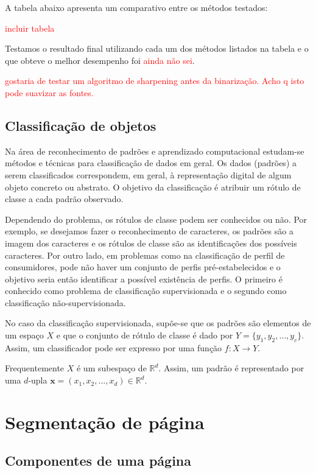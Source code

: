 \documentclass[a4paper,11pt]{article}
\newcommand{\TODO}[1]{\textcolor{red}{#1}}
\begin{document}
A tabela abaixo apresenta um comparativo entre os métodos testados:

\TODO{incluir tabela}

Testamos o resultado final utilizando cada um dos métodos listados na tabela e o que obteve o melhor desempenho foi \TODO{ainda não sei}.

\TODO{gostaria de testar um algoritmo de sharpening antes da binarização. Acho q isto pode suavizar as fontes.}

\subsection{Classificação de objetos}

Na área de reconhecimento de padrões e aprendizado computacional
estudam-se métodos e técnicas para classificação de dados em geral. Os
dados (padrões) a serem classificados correspondem, em geral, à
representação digital de algum objeto concreto ou abstrato. O objetivo
da classificação é atribuir um rótulo de classe a cada padrão
observado.

Dependendo do problema, os rótulos de classe podem ser conhecidos ou
não. Por exemplo, se desejamos fazer o reconhecimento de caracteres,
os padrões são a imagem dos caracteres e os rótulos de classe são as
identificações dos possíveis caracteres. Por outro lado, em problemas
como na classificação de perfil de consumidores, pode não haver um
conjunto de perfis pré-estabelecidos e o objetivo seria então
identificar a possível existência de perfis. O primeiro é conhecido
como problema de classificação supervisionada e o segundo como
classificação não-supervisionada.

No caso da classificação supervisionada, supõe-se que os padrões são
elementos de um espaço $X$ e que o conjunto de rótulo de classe é dado
por $Y=\{y_1,y_2,\ldots,y_c\}$. Assim, um classificador pode ser
expresso por uma função $f: X \to Y$.

Frequentemente $X$ é um subespaço de $\mathbb{R}^d$. Assim, um padrão
é representado por uma $d$-upla $\mathbf{x}=(x_1,x_2,\ldots,x_d) \in
\mathbb{R}^d$.


 



\section{Segmentação de página}


\subsection{Componentes de uma página}
\end{document}
